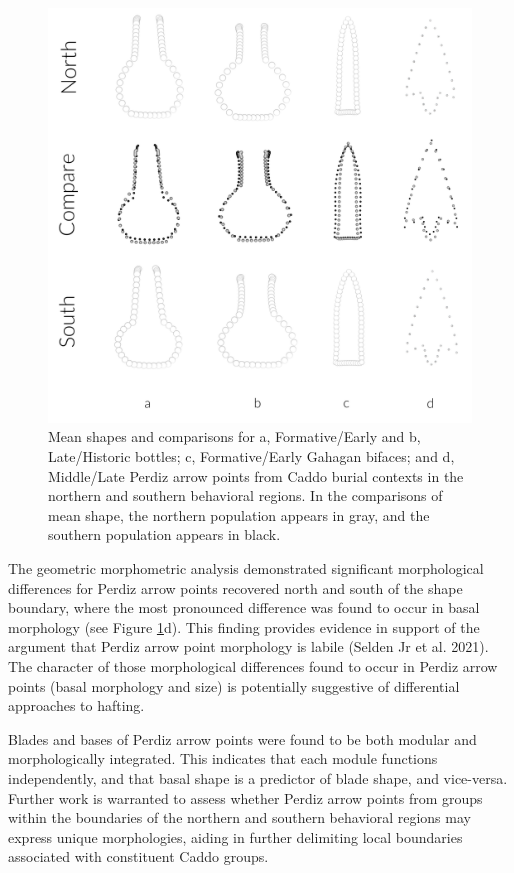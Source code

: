 \documentclass[smallextended]{svjour3}       %
\begin{document}
\begin{figure}
\includegraphics[width=1\linewidth]{ms-figs/figure6} \caption{Mean shapes and comparisons for a, Formative/Early and b, Late/Historic bottles; c, Formative/Early Gahagan bifaces; and d, Middle/Late Perdiz arrow points from Caddo burial contexts in the northern and southern behavioral regions. In the comparisons of mean shape, the northern population appears in gray, and the southern population appears in black.}\label{fig:fig6}
\end{figure}

The geometric morphometric analysis demonstrated significant
morphological differences for Perdiz arrow points recovered north and
south of the shape boundary, where the most pronounced difference was
found to occur in basal morphology (see Figure \ref{fig:fig6}d). This
finding provides evidence in support of the argument that Perdiz arrow
point morphology is labile (Selden Jr et al. 2021). The character of
those morphological differences found to occur in Perdiz arrow points
(basal morphology and size) is potentially suggestive of differential
approaches to hafting.

Blades and bases of Perdiz arrow points were found to be both modular
and morphologically integrated. This indicates that each module
functions independently, and that basal shape is a predictor of blade
shape, and vice-versa. Further work is warranted to assess whether
Perdiz arrow points from groups within the boundaries of the northern
and southern behavioral regions may express unique morphologies, aiding
in further delimiting local boundaries associated with constituent Caddo
groups.
\end{document}
